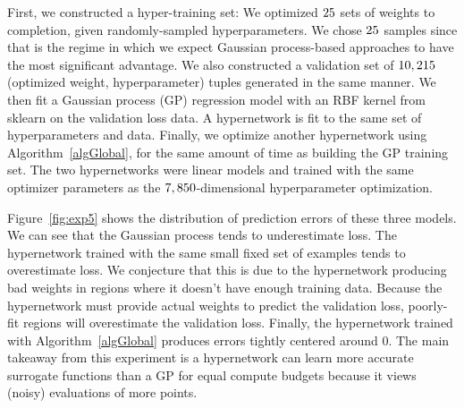 \documentclass{article} %
\begin{document}
First, we constructed a hyper-training set: We optimized $25$ sets of weights to completion, given randomly-sampled hyperparameters.
We chose $25$ samples since that is the regime in which we expect Gaussian process-based approaches to have the most significant advantage.
We also constructed a validation set of $10,215$ (optimized weight, hyperparameter) tuples generated in the same manner.
{\color{red}We then fit a Gaussian process (GP)} regression model with an RBF kernel from sklearn on the validation loss data.
{\color{green}A hypernetwork is fit to the same set of hyperparameters and data}.
Finally, {\color{blue}we optimize another hypernetwork using Algorithm~\ref{algGlobal}}, for the same amount of time as building the GP training set.
The two hypernetworks were linear models and trained with the same optimizer parameters as the $7,850$-dimensional hyperparameter optimization.

Figure~\ref{fig:exp5} shows the distribution of prediction errors of these three models.
We can see that the Gaussian process tends to underestimate loss.
The hypernetwork trained with the same small fixed set of examples tends to overestimate loss.
We conjecture that this is due to the hypernetwork producing bad weights in regions where it doesn't have enough training data.
Because the hypernetwork must provide actual weights to predict the validation loss, poorly-fit regions will overestimate the validation loss.
Finally, the hypernetwork trained with Algorithm~\ref{algGlobal} produces errors tightly centered around 0.
The main takeaway from this experiment is a hypernetwork can learn more accurate surrogate functions than a GP for equal compute budgets because it views (noisy) evaluations of more points.
%

\end{document}
